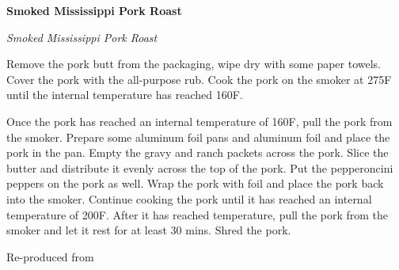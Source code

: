 \documentclass[../recipe-collections/cooking.tex]{subfiles}
\begin{document}
\begin{recipe}{\textbf{Smoked Mississippi Pork Roast}}{}{}

  \freeform{}\textit{Smoked Mississippi Pork Roast}


  Remove the pork butt from the packaging, wipe dry with some paper towels.
  Cover the pork with the all-purpose rub. Cook the pork on the smoker at 275F
  until the internal temperature has reached 160F.


  Once the pork has reached an internal temperature of 160F, pull the pork
  from the smoker. Prepare some aluminum foil pans and aluminum foil and 
  place the pork in the pan. Empty the gravy and ranch packets across the pork.
  Slice the butter and distribute it evenly across the top of the pork. Put the 
  pepperoncini peppers on the pork as well. Wrap the pork with foil and place
  the pork back into the smoker. Continue cooking the pork until it has reached
  an internal temperature of 200F. After it has reached temperature, pull the pork
  from the smoker and let it rest for at least 30 mins. Shred the pork.

  \freeform{}\hrulefill{}

\end{recipe}

Re-produced from  \autocite{HowToBBQRight_PorkRoast_2022}
\end{document}
